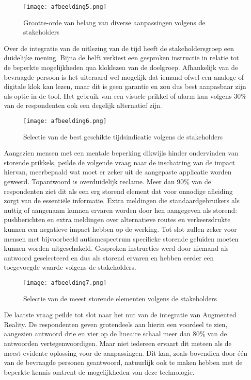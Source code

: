 \begin{figure}[h]
    \centering
    \texttt{[image: afbeelding5.png]}
    \caption{Grootte-orde van belang van diverse aanpassingen volgens de stakeholders}
    \label{fig:belang}
\end{figure}

Over de integratie van de uitlezing van de tijd heeft de stakeholdersgroep een duidelijke mening. Bijna de helft verkiest een gesproken instructie in relatie tot de beperkte mogelijkheden qua kloklezen van de doelgroep. Afhankelijk van de bevraagde persoon is het uiteraard wel mogelijk dat iemand ofwel een analoge of digitale klok kan lezen, maar dit is geen garantie en zou dus best aanpasbaar zijn als optie in de tool. Het gebruik van een visuele prikkel of alarm kan volgens 30\% van de respondenten ook een degelijk alternatief zijn.

\begin{figure}[h]
    \centering
    \texttt{[image: afbeelding6.png]}
    \caption{Selectie van de best geschikte tijdsindicatie volgens de stakeholders}
    \label{fig:selectietijd}
\end{figure}

Aangezien mensen met een mentale beperking dikwijls hinder ondervinden van storende prikkels, peilde de volgende vraag naar de inschatting van de impact hiervan, meerbepaald wat moet er zeker uit de aangepaste applicatie worden geweerd. Topantwoord is overduidelijk reclame. Meer dan 90\% van de respondenten ziet dit als een erg storend element dat voor onnodige afleiding zorgt van de essentiële informatie. Extra meldingen die standaardgebruikers als nuttig of aangenaam kunnen ervaren worden door hen aangegeven als storend: pushberichten en extra meldingen over alternatieve routes en verkeersdrukte kunnen een negatieve impact hebben op de werking. Tot slot zullen zeker voor mensen met bijvoorbeeld autismespectrum specifieke storende geluiden moeten kunnen worden uitgeschakeld. Gesproken instructies werd door niemand als antwoord geselecteerd en dus als storend ervaren en hebben eerder een toegevoegde waarde volgens de stakeholders.

\begin{figure}[h]
    \centering
    \texttt{[image: afbeelding7.png]}
    \caption{Selectie van de meest storende elementen volgens de stakeholders}
    \label{fig:selectiestorend}
\end{figure}

De laatste vraag peilde tot slot naar het nut van de integratie van Augmented Reality. De respondenten geven grotendeels aan hierin een voordeel te zien, aangezien antwoord drie en vier op de lineaire schaal meer dan 80\% van de antwoorden vertegenwoordigen. Maar niet iedereen ervaart dit meteen als de meest evidente oplossing voor de aanpassingen. Dit kan, zoals bovendien door één van de bevraagde personen geantwoord, natuurlijk ook te maken hebben met de beperkte kennis omtrent de mogelijkheden van deze technologie.


